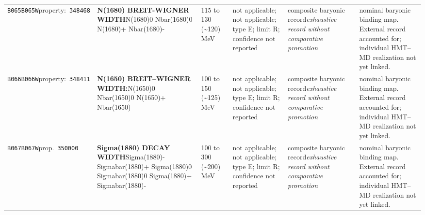 \begin{landscape}
\begin{longtable}{L{1.85cm}L{4.45cm}L{2.35cm}L{4.05cm}L{3.35cm}L{7.15cm}}
\texttt{B065}\newline \texttt{B065W}\newline property:\ \texttt{348468} & \textbf{N(1680) BREIT-WIGNER WIDTH}\newline N(1680)0 \textbar{}\allowbreak{} Nbar(1680)0 \textbar{}\allowbreak{} N(1680)+ \textbar{}\allowbreak{} Nbar(1680)- & 115 to 130 (\textasciitilde{}120)\,MeV & not applicable; not applicable; type E; limit R; confidence not reported & composite baryonic record\newline \emph{exhaustive record without comparative promotion} & nominal baryonic binding map. External record accounted for; individual HMT--MD realization not yet linked. \\
\texttt{B066}\newline \texttt{B066W}\newline property:\ \texttt{348411} & \textbf{N(1650) BREIT--WIGNER WIDTH:}\newline N(1650)0 \textbar{}\allowbreak{} Nbar(1650)0 \textbar{}\allowbreak{} N(1650)+ \textbar{}\allowbreak{} Nbar(1650)- & 100 to 150 (\textasciitilde{}125)\,MeV & not applicable; not applicable; type E; limit R; confidence not reported & composite baryonic record\newline \emph{exhaustive record without comparative promotion} & nominal baryonic binding map. External record accounted for; individual HMT--MD realization not yet linked. \\
\texttt{B067}\newline \texttt{B067W}\newline prop.\ \texttt{350000} & \textbf{Sigma(1880) DECAY WIDTH}\newline Sigma(1880)- \textbar{}\allowbreak{} Sigmabar(1880)+ \textbar{}\allowbreak{} Sigma(1880)0 \textbar{}\allowbreak{} Sigmabar(1880)0 \textbar{}\allowbreak{} Sigma(1880)+ \textbar{}\allowbreak{} Sigmabar(1880)- & 100 to 300 (\textasciitilde{}200)\,MeV & not applicable; not applicable; type E; limit R; confidence not reported & composite baryonic record\newline \emph{exhaustive record without comparative promotion} & nominal baryonic binding map. External record accounted for; individual HMT--MD realization not yet linked. \\

\end{longtable}
\end{landscape}
